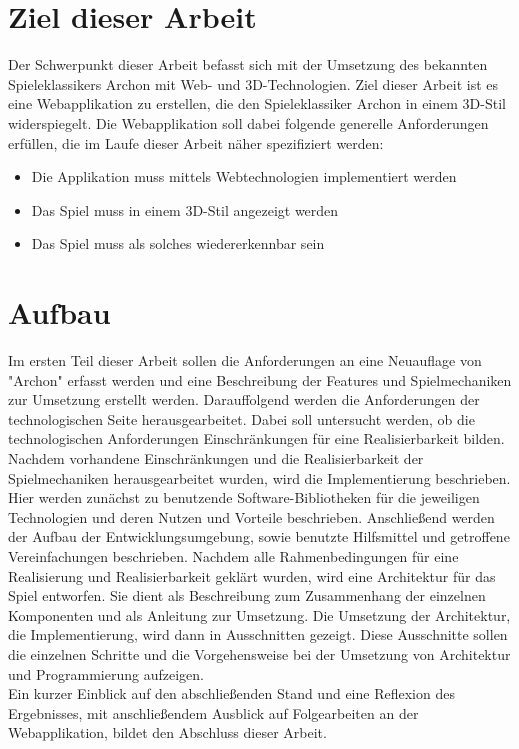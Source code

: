 \section{Ziel dieser Arbeit}
\label{sec:ziel_dieser_arbeit}
Der Schwerpunkt dieser Arbeit befasst sich mit der Umsetzung des bekannten Spieleklassikers Archon mit Web- und 3D-Technologien.
Ziel dieser Arbeit ist es eine Webapplikation zu erstellen, die den Spieleklassiker Archon in einem 3D-Stil widerspiegelt.
Die Webapplikation soll dabei folgende generelle Anforderungen erfüllen, die im Laufe dieser Arbeit näher spezifiziert werden:
\begin{itemize}
	\item Die Applikation muss mittels Webtechnologien implementiert werden
	\item Das Spiel muss in einem 3D-Stil angezeigt werden
	\item Das Spiel muss als solches wiedererkennbar sein
\end{itemize}
\section{Aufbau}
\label{sec:aufbau}

Im ersten Teil dieser Arbeit sollen die Anforderungen an eine Neuauflage von "Archon" erfasst werden und eine Beschreibung der Features und Spielmechaniken zur Umsetzung erstellt werden.
Darauffolgend werden die Anforderungen der technologischen Seite herausgearbeitet. Dabei soll untersucht werden, ob die technologischen Anforderungen Einschränkungen für eine Realisierbarkeit bilden.\\
Nachdem \ggf vorhandene Einschränkungen und die Realisierbarkeit der Spielmechaniken herausgearbeitet wurden, wird die Implementierung beschrieben. Hier werden zunächst zu benutzende Software-Bibliotheken für die jeweiligen Technologien und deren Nutzen und Vorteile beschrieben.
Anschließend werden der Aufbau der Entwicklungsumgebung, sowie benutzte Hilfsmittel und getroffene Vereinfachungen beschrieben.
Nachdem alle Rahmenbedingungen für eine Realisierung und Realisierbarkeit geklärt wurden, wird eine Architektur für das Spiel entworfen. Sie dient als Beschreibung zum Zusammenhang der einzelnen Komponenten und als Anleitung zur Umsetzung.
Die Umsetzung der Architektur, die Implementierung, wird dann in Ausschnitten gezeigt. Diese Ausschnitte sollen die einzelnen Schritte und die Vorgehensweise bei der Umsetzung von Architektur und Programmierung aufzeigen.\\
Ein kurzer Einblick auf den abschließenden Stand und eine Reflexion des Ergebnisses, mit anschließendem Ausblick auf Folgearbeiten an der Webapplikation, bildet den Abschluss dieser Arbeit.